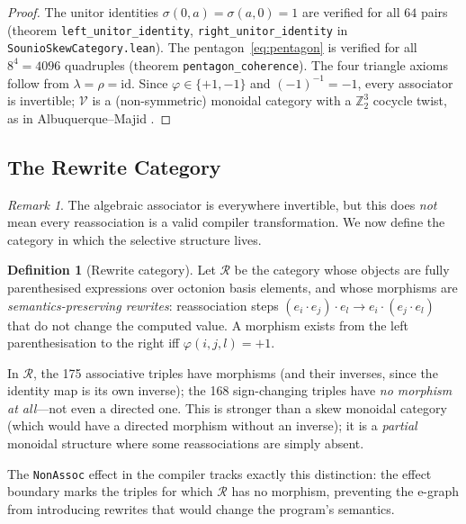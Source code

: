 \documentclass[11pt,a4paper]{article}
\theoremstyle{definition}
\newtheorem{definition}[theorem]{Definition}
\theoremstyle{remark}
\newtheorem{remark}[theorem]{Remark}
\newcommand{\ZZ}{\mathbb{Z}}
\begin{document}
\begin{proof}
The unitor identities $\sigma(0,a) = \sigma(a,0) = 1$ are verified
for all $64$ pairs (theorem \texttt{left\_unitor\_identity},
\texttt{right\_unitor\_identity} in \texttt{SounioSkewCategory.lean}).
The pentagon~\eqref{eq:pentagon} is verified for all
$8^4 = 4096$ quadruples (theorem \texttt{pentagon\_coherence}).
The four triangle axioms follow from $\lambda = \rho = \mathrm{id}$.
Since $\varphi \in \{+1,-1\}$ and $(-1)^{-1} = -1$, every associator
is invertible; $\mathcal{V}$ is a (non-symmetric) monoidal category
with a $\ZZ_2^3$ cocycle twist, as in Albuquerque--Majid
\cite{albuquerque1999}.
\end{proof}

\subsection{The Rewrite Category}\label{sec:rewrite-cat}

\begin{remark}\label{rem:semantic}
The algebraic associator is everywhere invertible, but this does
\emph{not} mean every reassociation is a valid compiler
transformation. We now define the category in which the selective
structure lives.
\end{remark}

\begin{definition}[Rewrite category]\label{def:rewrite-cat}
Let $\mathcal{R}$ be the category whose objects are fully
parenthesised expressions over octonion basis elements, and whose
morphisms are \emph{semantics-preserving rewrites}: reassociation
steps $(e_i \cdot e_j) \cdot e_l \to e_i \cdot (e_j \cdot e_l)$
that do not change the computed value. A morphism exists from the
left parenthesisation to the right iff $\varphi(i,j,l) = +1$.
\end{definition}

In $\mathcal{R}$, the 175 associative triples have morphisms (and
their inverses, since the identity map is its own inverse); the 168
sign-changing triples have \emph{no morphism at all}---not even a
directed one. This is stronger than a skew monoidal category (which
would have a directed morphism without an inverse); it is a
\emph{partial} monoidal structure where some reassociations are
simply absent.

The \texttt{NonAssoc} effect in the compiler tracks exactly this
distinction: the effect boundary marks the triples for which
$\mathcal{R}$ has no morphism, preventing the e-graph from
introducing rewrites that would change the program's semantics.
\end{document}

